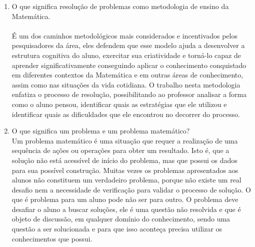 \documentclass[a4paper, 12pt]{article}
\begin{document}
\begin{enumerate}
\item O que significa resolução de problemas como metodologia de ensino da Matemática. \\ \\
  É um dos caminhos metodológicos mais considerados e incentivados pelos pesquisadores da área, eles defendem que esse modelo ajuda a desenvolver a estrutura cognitiva do aluno, exercitar sua criatividade e torná-lo capaz de aprender significativamente conseguindo aplicar o conhecimento conquistado em diferentes contextos da Matemática e em outras áreas de conhecimento, assim como nas situações da vida cotidiana. O trabalho nesta metodologia enfatiza o processo de resolução, possibilitando ao professor analisar a forma como o aluno pensou, identificar quais as estratégias que ele utilizou e identificar quais as dificuldades que ele encontrou no decorrer do processo.

\item O que significa um problema e um problema matemático?  \\ 
  Um problema matemático é uma situação que requer a realização de uma sequência de ações ou operações para obter um resultado. Isto é, que a solução não está acessível de início do problema, mas que possui os dados para sua possível construção. Muitas vezes os problemas apresentados aos alunos não constituem um verdadeiro problema, porque não existe um real desafio nem a necessidade de verificação para validar o processo de solução. O que é problema para um aluno pode não ser para outro.
O problema deve desafiar o aluno a buscar soluções, ele é uma questão não resolvida e que é objeto de discussão, em qualquer domínio do conhecimento, sendo uma questão a ser solucionada e para que isso aconteça precisa utilizar os conhecimentos que possui.


\end{enumerate}
\end{document}
